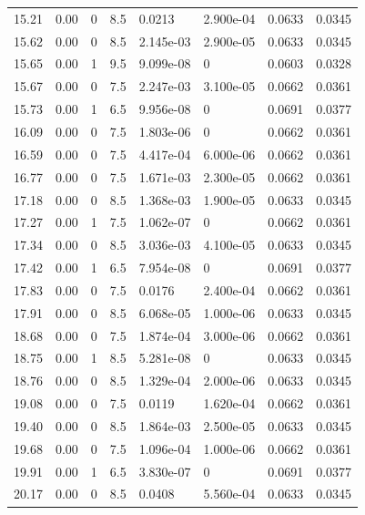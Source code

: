 \documentclass[preview]{standalone}
\begin{document}
{{{\begin{tabular}{L{1.2cm}C{1.2cm} C{0.3cm}C{0.5cm} C{1.4cm}C{1.4cm} C{1.4cm}C{1.4cm}}
  15.21  &  0.00  & 0     & 8.5 &  0.0213  & 2.900e-04  & 0.0633 &  0.0345   \\ 
  15.62  &  0.00  & 0     & 8.5 &  2.145e-03  & 2.900e-05  & 0.0633 &  0.0345   \\ 
  15.65  &  0.00  & 1     & 9.5 &  9.099e-08  & 0  & 0.0603 &  0.0328   \\ 
  15.67  &  0.00  & 0     & 7.5 &  2.247e-03  & 3.100e-05  & 0.0662 &  0.0361   \\ 
  15.73  &  0.00  & 1     & 6.5 &  9.956e-08  & 0  & 0.0691 &  0.0377   \\ 
  16.09  &  0.00  & 0     & 7.5 &  1.803e-06  & 0  & 0.0662 &  0.0361   \\ 
  16.59  &  0.00  & 0     & 7.5 &  4.417e-04  & 6.000e-06  & 0.0662 &  0.0361   \\ 
  16.77  &  0.00  & 0     & 7.5 &  1.671e-03  & 2.300e-05  & 0.0662 &  0.0361   \\ 
  17.18  &  0.00  & 0     & 8.5 &  1.368e-03  & 1.900e-05  & 0.0633 &  0.0345   \\ 
  17.27  &  0.00  & 1     & 7.5 &  1.062e-07  & 0  & 0.0662 &  0.0361   \\ 
  17.34  &  0.00  & 0     & 8.5 &  3.036e-03  & 4.100e-05  & 0.0633 &  0.0345   \\ 
  17.42  &  0.00  & 1     & 6.5 &  7.954e-08  & 0  & 0.0691 &  0.0377   \\ 
  17.83  &  0.00  & 0     & 7.5 &  0.0176  & 2.400e-04  & 0.0662 &  0.0361   \\ 
  17.91  &  0.00  & 0     & 8.5 &  6.068e-05  & 1.000e-06  & 0.0633 &  0.0345   \\ 
  18.68  &  0.00  & 0     & 7.5 &  1.874e-04  & 3.000e-06  & 0.0662 &  0.0361   \\ 
  18.75  &  0.00  & 1     & 8.5 &  5.281e-08  & 0  & 0.0633 &  0.0345   \\ 
  18.76  &  0.00  & 0     & 8.5 &  1.329e-04  & 2.000e-06  & 0.0633 &  0.0345   \\ 
  19.08  &  0.00  & 0     & 7.5 &  0.0119  & 1.620e-04  & 0.0662 &  0.0361   \\ 
  19.40  &  0.00  & 0     & 8.5 &  1.864e-03  & 2.500e-05  & 0.0633 &  0.0345   \\ 
  19.68  &  0.00  & 0     & 7.5 &  1.096e-04  & 1.000e-06  & 0.0662 &  0.0361   \\ 
  19.91  &  0.00  & 1     & 6.5 &  3.830e-07  & 0  & 0.0691 &  0.0377   \\ 
  20.17  &  0.00  & 0     & 8.5 &  0.0408  & 5.560e-04  & 0.0633 &  0.0345   \\ 

\end{tabular}}}}
\end{document}
